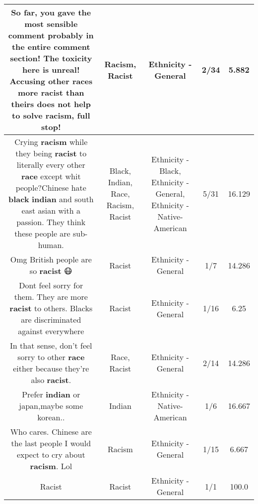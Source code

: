 \documentclass[11pt]{article}
\newlength\mylength
\begin{document}
\begin{center}
\begin{longtable}{|C{.65\mylength}|C{.30\mylength}|C{.12\mylength}|C{.12\mylength}|C{.12\mylength}|}
  \small So far, you gave the most sensible comment probably in the entire comment section! The toxicity here is unreal! Accusing other races more \textbf{racist} than theirs does not help to solve \textbf{racism}, full stop!\normalsize   & Racism, Racist & Ethnicity - General & 2/34 & 5.882 \\  \hline
  \small Crying \textbf{racism} while they being \textbf{racist} to literally every other \textbf{race} except whit people?Chinese hate \textbf{black} \textbf{indian} and south east asian with a passion. They think these people are sub-human.\normalsize   & Black, Indian, Race, Racism, Racist & Ethnicity - Black, Ethnicity - General, Ethnicity - Native-American & 5/31 & 16.129 \\  \hline
  \small Omg British people are so \textbf{racist} 😷\normalsize   & Racist & Ethnicity - General & 1/7 & 14.286 \\  \hline
  \small Dont feel sorry for them. They are more \textbf{racist} to others. Blacks are discriminated against everywhere\normalsize   & Racist & Ethnicity - General & 1/16 & 6.25 \\  \hline
  \small In that sense, don't feel sorry to other \textbf{race} either because they're also \textbf{racist}.\normalsize   & Race, Racist & Ethnicity - General & 2/14 & 14.286 \\  \hline
  \small Prefer \textbf{indian} or japan,maybe some korean..\normalsize   & Indian & Ethnicity - Native-American & 1/6 & 16.667 \\  \hline
  \small Who cares. Chinese are the last people I would expect to cry about \textbf{racism}. Lol\normalsize   & Racism & Ethnicity - General & 1/15 & 6.667 \\  \hline
  \small Racist\normalsize   & Racist & Ethnicity - General & 1/1 & 100.0 \\  \hline

\end{longtable}
\end{center}
\end{document}

